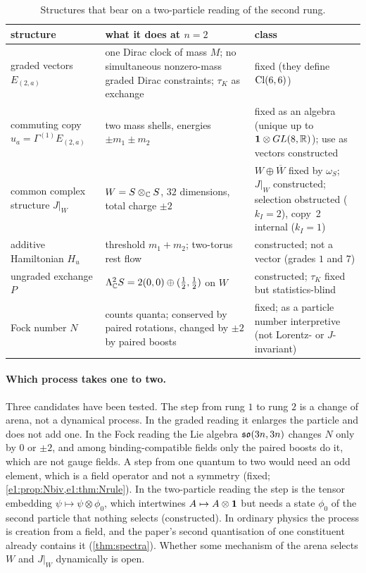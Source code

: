 \begin{table}[t]
\centering
\footnotesize
\begin{tabular}{@{}>{\raggedright\arraybackslash}p{3.6cm}>{\raggedright\arraybackslash}p{6.4cm}>{\raggedright\arraybackslash}p{4.6cm}@{}}
\toprule
structure & what it does at $n=2$ & class\\
\midrule
graded vectors $E_{(2,a)}$ & one Dirac clock of mass $M$; no simultaneous nonzero-mass graded Dirac constraints; $\tau_K$ as exchange & fixed (they define $\mathrm{Cl}(6,6)$)\\
commuting copy $u_a=\Gamma^{(1)}E_{(2,a)}$ & two mass shells, energies $\pm m_1\pm m_2$ & fixed as an algebra (unique up to $\mathbf 1\otimes GL(8,\mathbb{R})$); use as vectors constructed\\
common complex structure $J|_W$ & $W=S\otimes_{\mathbb{C}} S$, $32$ dimensions, total charge $\pm2$ & $W\oplus\overline W$ fixed by $\omega_S$; $J|_W$ constructed; selection obstructed ($k_I=2$), copy~2 internal ($k_I=1$)\\
additive Hamiltonian $H_u$ & threshold $m_1+m_2$; two-torus rest flow & constructed; not a vector (grades $1$ and $7$)\\
ungraded exchange $P$ & $\Lambda^2_{\mathbb{C}} S=2(0,0)\oplus(\tfrac12,\tfrac12)$ on $W$ & constructed; $\tau_K$ fixed but statistics-blind\\
Fock number $N$ & counts quanta; conserved by paired rotations, changed by $\pm2$ by paired boosts & fixed; as a particle number interpretive (not Lorentz- or $J$-invariant)\\
\bottomrule
\end{tabular}
\caption{Structures that bear on a two-particle reading of the second rung.}
\label{e1:tab:answer}
\end{table}

\paragraph{Which process takes one to two.} Three candidates have been tested. The step from rung $1$ to rung $2$ is a change of arena,
not a dynamical process. In the graded reading it enlarges the particle and does not add one. In the Fock reading the Lie algebra
$\mathfrak{so}(3n,3n)$ changes $N$ only by $0$ or $\pm2$, and among binding-compatible fields only the paired boosts do it, which are not gauge fields.
A step from one quantum to two would need an odd element, which is a field operator and not a symmetry (fixed;
\cref{e1:prop:Nbiv,e1:thm:Nrule}). In the two-particle reading the step is the tensor embedding $\psi\mapsto\psi\otimes\phi_0$, which intertwines
$A\mapsto A\otimes\mathbf 1$ but needs a state $\phi_0$ of the second particle that nothing selects (constructed). In ordinary physics
the process is creation from a field, and the paper's second quantisation of one constituent already contains it (\cref{thm:spectra}). Whether some mechanism of the arena selects $W$ and $J|_W$ dynamically is open.

